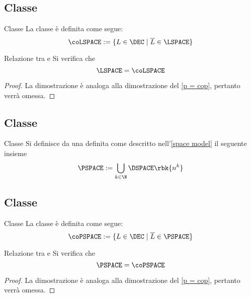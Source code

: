 \documentclass[a4paper, 12pt]{report}
\begin{document}
    \subsection{Classe \coLSPACE}

    \begin{frameddefn}{Classe \coLSPACE}
        La classe \coLSPACE è definita come segue: $$\coLSPACE := \{L \in \DEC \mid \overline L \in \LSPACE\}$$
    \end{frameddefn}

    \begin{framedthm}[label={l = col}]{Relazione tra \LSPACE e \coLSPACE}
        Si verifica che $$\LSPACE = \coLSPACE$$
    \end{framedthm}

    \begin{proof}
        La dimostrazione è analoga alla dimostrazione del \cref{p = cop}, pertanto verrà omessa.
    \end{proof}

    \subsection{Classe \PSPACE}

    \begin{frameddefn}{Classe \PSPACE}
        Si definisce  da una \TM definita come descritto nell'\cref{space model} il seguente insieme $$\PSPACE := \displaystyle \bigcup_{k \in \N}{\DSPACE \rbk{n^k}}$$
    \end{frameddefn}

    \subsection{Classe \coPSPACE}

    \begin{frameddefn}{Classe \coPSPACE}
        La classe \coPSPACE è definita come segue: $$\coPSPACE := \{L \in \DEC \mid \overline L \in \PSPACE\}$$
    \end{frameddefn}

    \begin{framedthm}[label={pspace = copspace}]{Relazione tra \PSPACE e \coPSPACE}
        Si verifica che $$\PSPACE = \coPSPACE$$
    \end{framedthm}

    \begin{proof}
        La dimostrazione è analoga alla dimostrazione del \cref{p = cop}, pertanto verrà omessa.
    \end{proof}
\end{document}
